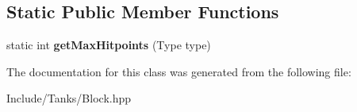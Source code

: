 \subsection*{Static Public Member Functions}
\begin{DoxyCompactItemize}
\item 
\hypertarget{class_block_ab49575e2c25a91b6a0edc7d620bf93a8}{}static int {\bfseries get\+Max\+Hitpoints} (Type type)\label{class_block_ab49575e2c25a91b6a0edc7d620bf93a8}

\end{DoxyCompactItemize}


The documentation for this class was generated from the following file\+:\begin{DoxyCompactItemize}
\item 
Include/\+Tanks/Block.\+hpp\end{DoxyCompactItemize}
